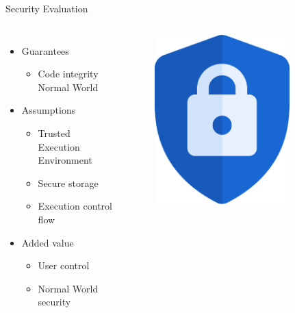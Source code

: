 \documentclass[]{beamer}
\begin{document}
\begin{frame}{Security Evaluation}
\begin{columns}
\begin{itemize}
\item Guarantees \begin{itemize}
\item Code integrity Normal World
\end{itemize}
\item Assumptions \begin{itemize}
\item Trusted Execution Environment
\item Secure storage
\item Execution control flow
\end{itemize}
\item Added value \begin{itemize}
\item User control
\item Normal World security
\end{itemize}
\end{itemize}
\begin{figure}
\includegraphics[width=0.8\textwidth]{Pictures/security.png}

\end{figure}
\end{columns}
\end{frame}
\end{document}
